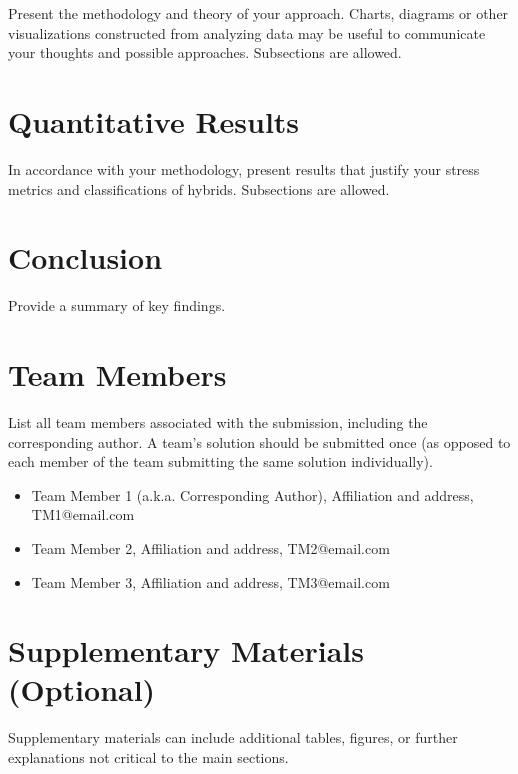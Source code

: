 \documentclass[syngen,nonblindrev]{informs3-syngen}
\begin{document}
Present the methodology and theory of your approach. Charts, diagrams or other
visualizations constructed from analyzing data may be useful to communicate your thoughts
and possible approaches. Subsections are allowed. 


\section{Quantitative Results}

In accordance with your methodology, present results that justify your stress metrics and classifications of hybrids. Subsections are allowed.

\section{Conclusion}

Provide a summary of key findings.

\section{Team Members}

List all team members associated with the submission, including the corresponding author. A team’s solution should be submitted once (as opposed to each member of the team submitting the same solution individually).

\begin{itemize}
\item Team Member 1 (a.k.a. Corresponding Author), Affiliation and address, TM1@email.com
\item Team Member 2, Affiliation and address, TM2@email.com
\item Team Member 3, Affiliation and address, TM3@email.com
\end{itemize}



\section{Supplementary Materials (Optional)}

Supplementary materials can include additional tables, figures, or further explanations not
critical to the main sections.






\end{document}
